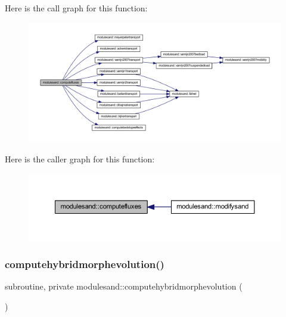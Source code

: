 Here is the call graph for this function\+:\nopagebreak
\begin{figure}[H]
\begin{center}
\leavevmode
\includegraphics[width=350pt]{namespacemodulesand_a5cbe25a8640cb153443de1585837b7a3_cgraph}
\end{center}
\end{figure}
Here is the caller graph for this function\+:\nopagebreak
\begin{figure}[H]
\begin{center}
\leavevmode
\includegraphics[width=350pt]{namespacemodulesand_a5cbe25a8640cb153443de1585837b7a3_icgraph}
\end{center}
\end{figure}
\mbox{\label{namespacemodulesand_ac778a6b170dc738d265d1108248728f3}} 
\subsubsection{\texorpdfstring{computehybridmorphevolution()}{computehybridmorphevolution()}}
{\footnotesize\ttfamily subroutine, private modulesand\+::computehybridmorphevolution (\begin{DoxyParamCaption}{ }\end{DoxyParamCaption})\hspace{0.3cm}{\ttfamily [private]}}

